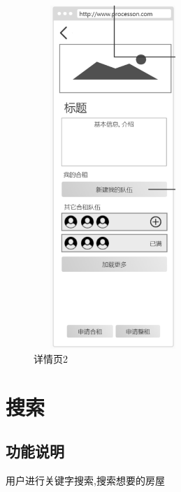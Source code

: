 \begin{figure}[htbp]
\begin{minipage}[t]{0.48\textwidth}
    \includegraphics[width=6cm,height=13cm]{design/image/ui5.png}
    \caption{详情页2}
    \end{minipage}
    \end{figure}

\newpage
\section{搜索}

\subsection{功能说明}
用户进行关键字搜索,搜索想要的房屋
